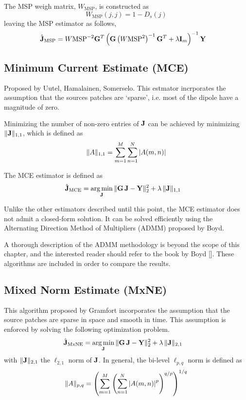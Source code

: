 The MSP weigh matrix, $W_\text{MSP}$, is constructed as
\begin{equation}
W_\text{MSP}(j,j) = 1-{D}_s(j)
\end{equation}
leaving the MSP estimator as follows,
\begin{align}
\hat{\mathbf{J}}_\text{MSP} &=
{W\text{MSP}}^{-2} \mathbf{G}^T \left(  \mathbf{G}\left( W\text{MSP}^2 \right)^{-1}\mathbf{G}^T + \lambda \mathbf{I}_m   \right)^{-1} \mathbf{Y}
\label{est:MSP}
\end{align}

\subsection{Minimum Current Estimate (MCE)}

Proposed by Uutel, Hamalainen, Somerselo.
%
This estmator incrporates the assumption that the sources patches are `sparse', i.e. most of the dipole have a magnitude of zero.

Minimizing the number of non-zero entries of $\mathbf{J}$ can be achieved by minimizing $\lVert \mathbf{J} \rVert_{1,1}$, which is defined as
\begin{equation}
\lVert A \rVert_{1,1} = \sum_{m=1}^M \sum_{n=1}^N \left| {A(m,n)} \right|
\end{equation}

The MCE estimator is defined as
\begin{align}
\hat{\mathbf{J}}_\text{MCE} &=
\operatorname*{arg\,min}_{\mathbf{J}}\, \lVert \mathbf{G}\, \mathbf{J} - \mathbf{Y}  \rVert_2^2 + \lambda\, \lVert \mathbf{J} \rVert_{1,1}
\label{est:MCE}
\end{align}

Unlike the other estimators described until this point, the MCE estimator does not admit a closed-form solution.
%
It can be solved efficiently using the Alternating Direction Method of Multipliers (ADMM) proposed by Boyd.

A thorough description of the ADMM methodology is beyond the scope of this chapter, and the interested reader should refer to the book by Boyd [].
%
These algorithms are included in order to compare the results.

\subsection{Mixed Norm Estimate (MxNE)}

This algorithm proposed by Gramfort incorporates the assumption that the source patches are sparse in space and smooth in time.
%
This assumption is enforced by solving the following optimization problem.
\begin{align}
\hat{\mathbf{J}}_\text{MxNE} &=
\operatorname*{arg\,min}_{\mathbf{J}}\, \lVert \mathbf{G}\, \mathbf{J} - \mathbf{Y}  \rVert_2^2 + \lambda\, \lVert \mathbf{J} \rVert_{2,1}
\label{est:MxNE}
\end{align}
with $\lVert \mathbf{J} \rVert_{2,1}$ the $\ell_{2,1}$ norm of $\mathbf{J}$.
%
In general, the bi-level $\ell_{p,q}$ norm is defined as
\begin{equation}
\lVert A \rVert_{p,q} =
\left( \sum_{m=1}^M \left(  \sum_{n=1}^N \left| {A(m,n)} \right|^p  \right)^{q/p} \right)^{1/q}
\end{equation}

